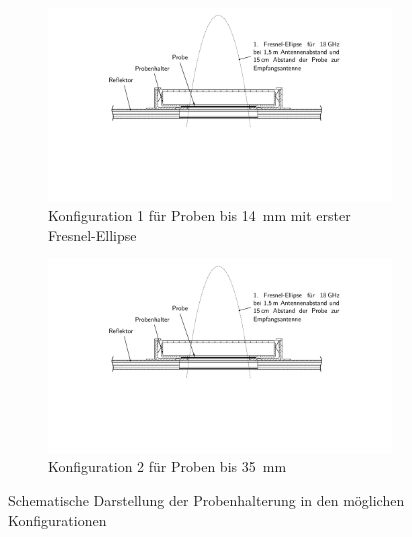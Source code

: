 \begin{figure}[ht]
    \centering
    \begin{subfigure}[b]{0.9\textwidth}
        \includegraphics[page = 1, width=\textwidth, trim = 4.3cm 7cm 4.8cm 0cm, clip]{Abbildungen/Kapitel3/Probenhalter.pdf}
        \caption{Konfiguration 1 für Proben bis \SI{14}{\milli\meter} mit erster Fresnel-Ellipse}\label{subfig:3_Probenhalter_Konfig1}
    \end{subfigure}
    \hspace{2cm}
    \begin{subfigure}[b]{0.85\textwidth}
        \includegraphics[page = 2, width=\textwidth, trim = 5cm 7cm 5.5cm 7cm, clip]{Abbildungen/Kapitel3/Probenhalter.pdf}
        \caption{Konfiguration 2 für Proben bis \SI{35}{\milli\meter}}\label{subfig:3_Probenhalter_Konfig2}
    \end{subfigure}
    \caption{Schematische Darstellung der Probenhalterung in den möglichen Konfigurationen}
    \label{fig:3_Probenhalterung_und_Reflektor}
\end{figure}
    

